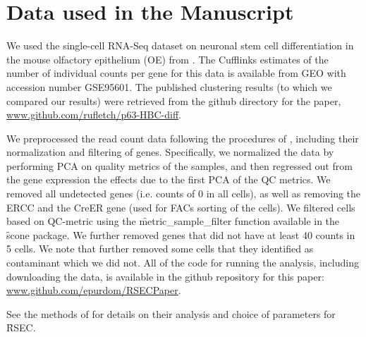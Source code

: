 \section{Data used in the Manuscript}
\label{sec:dataProcessing}

We used the single-cell RNA-Seq dataset on neuronal stem cell differentiation in the mouse olfactory epithelium (OE) from \cite{Fletcher:2017fq}. The Cufflinks estimates of the number of individual counts per gene for this data is available from GEO with accession number GSE95601. The published clustering results (to which we compared our results) were retrieved from the github directory for the \cite{Fletcher:2017fq} paper,  \url{www.github.com/rufletch/p63-HBC-diff}. 

We preprocessed the read count data following the procedures of \cite{Fletcher:2017fq}, including their normalization and filtering of genes. Specifically, we normalized the data by performing PCA on quality metrics of the samples, and then regressed out from the gene expression the effects due to the first PCA of the QC metrics. We removed all undetected genes (i.e. counts of 0 in all cells), as well as removing the ERCC and the CreER gene (used for FACs sorting of the cells). We filtered cells based on QC-metric using the \f{metric\_sample\_filter} function available in the \f{scone} package. We further removed genes that did not have at least 40 counts in 5 cells. We note that \cite{Fletcher:2017fq} further removed some cells that they identified as contaminant which we did not. All of the code for running the analysis, including downloading the data, is available in the github repository for this paper: \url{www.github.com/epurdom/RSECPaper}. 


See the methods of \cite{Fletcher:2017fq} for details on their analysis and choice of parameters for \f{RSEC}.


